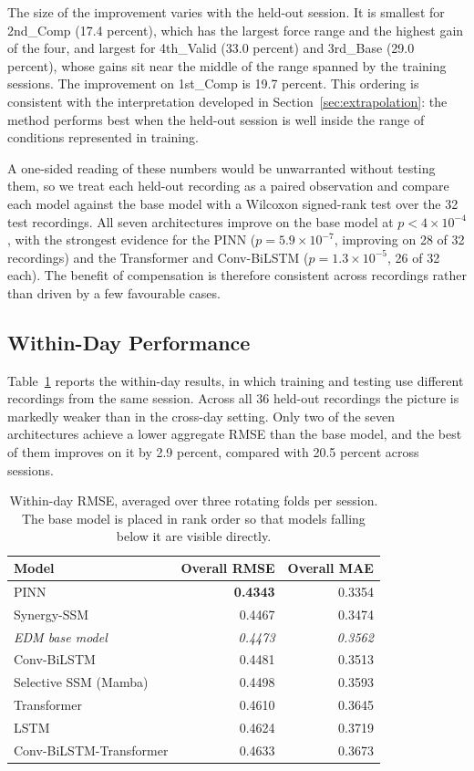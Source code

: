 The size of the improvement varies with the held-out session. It is smallest for
2nd\_Comp (17.4 percent), which has the largest force range and the highest gain
of the four, and largest for 4th\_Valid (33.0 percent) and 3rd\_Base
(29.0 percent), whose gains sit near the middle of the range spanned by the
training sessions. The improvement on 1st\_Comp is 19.7 percent. This ordering is
consistent with the interpretation developed in Section~\ref{sec:extrapolation}:
the method performs best when the held-out session is well inside the range of
conditions represented in training.

A one-sided reading of these numbers would be unwarranted without testing them,
so we treat each held-out recording as a paired observation and compare each
model against the base model with a Wilcoxon signed-rank test over the 32 test
recordings. All seven architectures improve on the base model at
$p < 4 \times 10^{-4}$, with the strongest evidence for the PINN
($p = 5.9 \times 10^{-7}$, improving on 28 of 32 recordings) and the Transformer
and Conv-BiLSTM ($p = 1.3 \times 10^{-5}$, 26 of 32 each). The benefit of
compensation is therefore consistent across recordings rather than driven by a
few favourable cases.

\subsection{Within-Day Performance}
\label{sec:withinday}

Table~\ref{tab:withinday} reports the within-day results, in which training and
testing use different recordings from the same session. Across all 36 held-out
recordings the picture is markedly weaker than in the cross-day setting. Only
two of the seven architectures achieve a lower aggregate RMSE than the base
model, and the best of them improves on it by 2.9 percent, compared with
20.5 percent across sessions.

\begin{table}[!t]
\caption{Within-day RMSE, averaged over three rotating folds per session. The
base model is placed in rank order so that models falling below it are visible
directly.}
\label{tab:withinday}
\centering
\begin{tabular}{lrr}
\toprule
Model & Overall RMSE & Overall MAE \\
\midrule
PINN                    & \textbf{0.4343} & 0.3354 \\
Synergy-SSM             & 0.4467 & 0.3474 \\
\textit{EDM base model} & \textit{0.4473} & \textit{0.3562} \\
Conv-BiLSTM             & 0.4481 & 0.3513 \\
Selective SSM (Mamba)   & 0.4498 & 0.3593 \\
Transformer             & 0.4610 & 0.3645 \\
LSTM                    & 0.4624 & 0.3719 \\
Conv-BiLSTM-Transformer & 0.4633 & 0.3673 \\
\bottomrule
\end{tabular}
\end{table}

